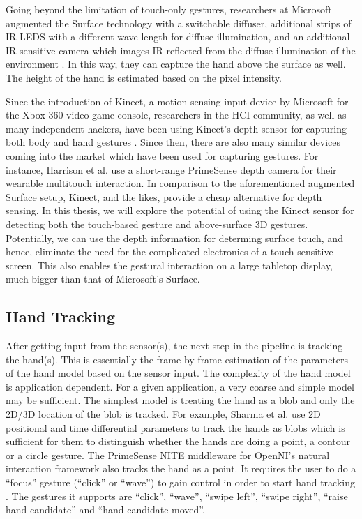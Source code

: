 Going beyond the limitation of touch-only gestures, researchers at Microsoft
augmented the Surface technology with a switchable diffuser, additional
strips of IR LEDS with a different wave length for diffuse illumination, and an
additional IR sensitive camera which images IR reflected from the diffuse
illumination of the environment \cite{hilliges09}. In this way, they can capture
the hand above the surface as well. The height of the hand is estimated based on
the pixel intensity.

Since the introduction of Kinect, a motion sensing input device by Microsoft for
the Xbox 360 video game console, researchers in the HCI community, as well as
many independent hackers, have been using Kinect's depth sensor for capturing
both body and hand gestures \cite{openni}. Since then, there are also many
similar devices coming into the market which have been used for capturing
gestures. For instance, Harrison et al. \cite{harrison11} use  a short-range
PrimeSense \cite{primesense} depth camera for their wearable multitouch
interaction. In comparison to the aforementioned augmented Surface setup,
Kinect, and the likes, provide a cheap alternative for depth sensing. In this
thesis, we will explore the potential of using the Kinect sensor for detecting 
both the touch-based gesture and above-surface 3D gestures. Potentially, we can 
use the depth information for determing surface touch, and hence, eliminate the 
need for the complicated electronics of a touch sensitive screen. This also 
enables the gestural interaction on a large tabletop display, much bigger than 
that of Microsoft's Surface.

\subsection{Hand Tracking}
After getting input from the sensor(s), the next step in the pipeline is
tracking the hand(s). This is essentially the frame-by-frame estimation of the
parameters of the hand model based on the sensor input. The complexity of the
hand model is application dependent. For a given application, a very coarse and
simple model may be sufficient. The simplest model is treating the hand as a
blob and only the 2D/3D location of the blob is tracked. For example, Sharma et
al. \cite{sharma00} use 2D positional and time differential parameters to track
the hands as blobs which is sufficient for them to distinguish whether the
hands are doing a point, a contour or a circle gesture. The PrimeSense NITE
middleware for OpenNI's natural interaction framework also tracks the hand as a
point. It requires the user to do a ``focus'' gesture (``click'' or ``wave'')
to gain control in order to start hand tracking \cite{primesense-manual}. The
gestures it supports are ``click'', ``wave'', ``swipe left'', ``swipe right'', 
``raise hand candidate'' and ``hand candidate moved''.

